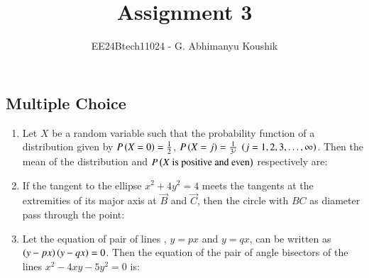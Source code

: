\documentclass[journal,12pt,onecolumn]{IEEEtran}
\theoremstyle{remark}
\begin{document}
\title{Assignment 3}
\author{EE24Btech11024 - G. Abhimanyu Koushik}
\maketitle
\renewcommand{\thefigure}{\theenumi}
\renewcommand{\thetable}{\theenumi}
\subsection{Multiple Choice}
\begin{enumerate}

\item Let $X$ be a random variable such that the probability function of a distribution given by $P\left(X=0\right)=\frac{1}{2}$, $P\left(X=j\right)=\frac{1}{3^j}$ $\left(j=1,2,3,\dots,\infty\right)$. Then the mean of the distribution and $P\left(X\text{ is positive and even}\right)$ respectively are:

\hfill{}
\begin{enumerate}
\end{enumerate}

\item If the tangent to the ellipse $x^2+4y^2=4$ meets the tangents at the extremities of its major axis at $\vec{B}$ and $\vec{C}$, then the circle with $BC$ as diameter pass through the point:

\hfill{}
\begin{enumerate}
\end{enumerate}

\item Let the equation of pair of lines , $y=px$ and $y=qx$, can be written as $\left(y-px\right)\left(y-qx\right)=0$. Then the equation of the pair of angle bisectors of the lines $x^2-4xy-5y^2=0$ is:


\end{enumerate}
\end{document}
